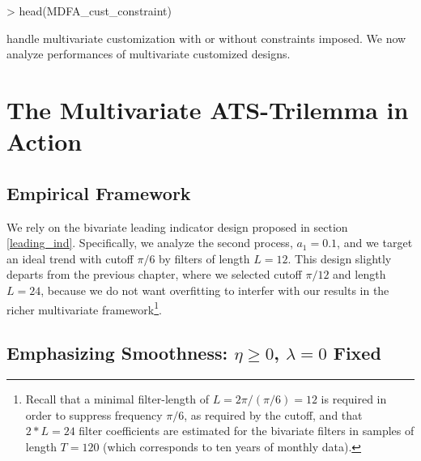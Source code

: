 \documentclass[a4paper]{book}
\begin{document}
\begin{Schunk}
\begin{Sinput}
> head(MDFA_cust_constraint)
\end{Sinput}
\begin{Soutput}
1 function (L, weight_func, Lag, Gamma, cutoff, lambda, eta, i1, 
2     i2, weight_constraint, shift_constraint)                   
3 {                                                              
4     lin_eta <- F                                               
5     lambda_cross <- lambda_smooth <- 0                         
6     lambda_decay <- c(0, 0)                                    
\end{Soutput}
\end{Schunk}
handle multivariate customization with or without constraints imposed. We now analyze performances of multivariate customized designs. 




\section{The Multivariate ATS-Trilemma in Action}\label{mul_ats_tr_i_a}


\subsection{Empirical Framework}

We rely on the bivariate leading indicator design proposed in section \ref{leading_ind}. Specifically, we analyze the second process, $a_1=0.1$, and we target an ideal trend with cutoff $\pi/6$ by filters of length $L=12$. This design slightly departs from the previous chapter, where we selected cutoff $\pi/12$ and length $L=24$, because we do not want overfitting to interfer with our results in the richer multivariate framework\footnote{Recall that a minimal filter-length of $L=2\pi/(\pi/6)=12$ is required in order to suppress frequency $\pi/6$, as required by the cutoff, and that $2*L=24$ filter coefficients are estimated for the bivariate filters in samples of length $T=120$ (which corresponds to ten years of monthly data).}. 





\subsection{Emphasizing Smoothness: $\eta\geq 0$, $\lambda=0$ Fixed}\label{e_s_mdfa}
\end{document}
